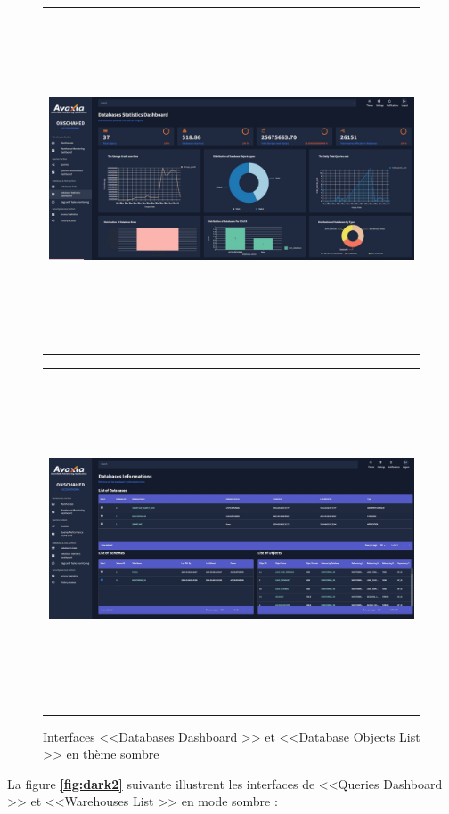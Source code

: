  \begin{figure}[H]
    \centering
    \begin{tabular}[b]{c}
        \includegraphics[width=1\linewidth,height= 10cm]{img/captures/dark/2.jpg}
        \end{tabular}
        \begin{tabular}[b]{c}
            \includegraphics[width=1\linewidth ,height= 10cm]{img/captures/dark/4.jpg}
            \end{tabular}
            \caption{Interfaces <<Databases Dashboard >> et <<Database Objects List >> en thème sombre}
            \label{fig:dark1}
\end{figure}
\newpage
\par La figure \textbf{\ref{fig:dark2}} suivante illustrent les interfaces de <<Queries Dashboard >> et <<Warehouses List >> en mode sombre :

